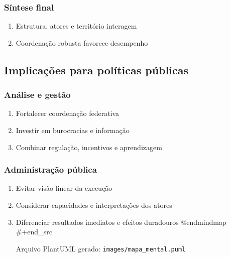 \documentclass[12pt,a4paper]{article}
\begin{document}
\subsubsection{Síntese final}
\label{sec:org7dc0637}
\begin{enumerate}
\item Estrutura, atores e território interagem
\label{sec:org3606632}
\item Coordenação robusta favorece desempenho
\label{sec:org51a6a69}
\end{enumerate}
\subsection{Implicações para políticas públicas}
\label{sec:org8c52148}
\subsubsection{Análise e gestão}
\label{sec:orgbe829c4}
\begin{enumerate}
\item Fortalecer coordenação federativa
\label{sec:orgad4ea6c}
\item Investir em burocracias e informação
\label{sec:org6b23e94}
\item Combinar regulação, incentivos e aprendizagem
\label{sec:org8e3d373}
\end{enumerate}
\subsubsection{Administração pública}
\label{sec:orgee472cb}
\begin{enumerate}
\item Evitar visão linear da execução
\label{sec:org133bfd2}
\item Considerar capacidades e interpretações dos atores
\label{sec:org27cf18d}
\item Diferenciar resultados imediatos e efeitos duradouros
\label{sec:org963a441}
@endmindmap
\#+end\_src

Arquivo PlantUML gerado: \texttt{images/mapa\_mental.puml}

\printbibliography
\end{enumerate}
\end{document}
